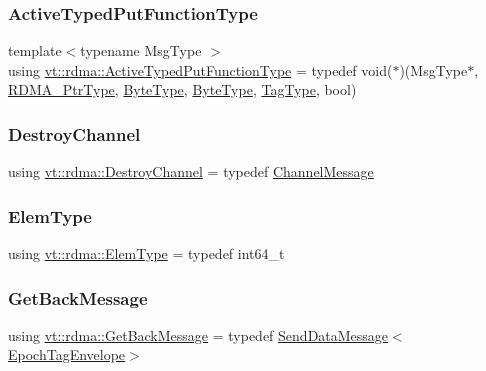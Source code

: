 \subsubsection{\texorpdfstring{Active\+Typed\+Put\+Function\+Type}{ActiveTypedPutFunctionType}}
{\footnotesize\ttfamily template$<$typename Msg\+Type $>$ \\
using \hyperlink{namespacevt_1_1rdma_a56f7eb7ecfa7e6824d3abb4afb634a37}{vt\+::rdma\+::\+Active\+Typed\+Put\+Function\+Type} = typedef void($\ast$)(Msg\+Type$\ast$, \hyperlink{namespacevt_aab05b4a584f7ee835a6d0f66915cf59b}{R\+D\+M\+A\+\_\+\+Ptr\+Type}, \hyperlink{namespacevt_aab8d55968084610ce3b17057981e9300}{Byte\+Type}, \hyperlink{namespacevt_aab8d55968084610ce3b17057981e9300}{Byte\+Type}, \hyperlink{namespacevt_a84ab281dae04a52a4b243d6bf62d0e52}{Tag\+Type}, bool)}

\mbox{\label{namespacevt_1_1rdma_a1273aeddd73c1ffac0d7383ef7a314d8}} 
\subsubsection{\texorpdfstring{Destroy\+Channel}{DestroyChannel}}
{\footnotesize\ttfamily using \hyperlink{namespacevt_1_1rdma_a1273aeddd73c1ffac0d7383ef7a314d8}{vt\+::rdma\+::\+Destroy\+Channel} = typedef \hyperlink{structvt_1_1rdma_1_1_channel_message}{Channel\+Message}}

\mbox{\label{namespacevt_1_1rdma_a38e310504e675aa1bcaf7811019b0df2}} 
\subsubsection{\texorpdfstring{Elem\+Type}{ElemType}}
{\footnotesize\ttfamily using \hyperlink{namespacevt_1_1rdma_a38e310504e675aa1bcaf7811019b0df2}{vt\+::rdma\+::\+Elem\+Type} = typedef int64\+\_\+t}

\mbox{\label{namespacevt_1_1rdma_a72a94b92eba75ec9fec43b2a9a4ad878}} 
\subsubsection{\texorpdfstring{Get\+Back\+Message}{GetBackMessage}}
{\footnotesize\ttfamily using \hyperlink{namespacevt_1_1rdma_a72a94b92eba75ec9fec43b2a9a4ad878}{vt\+::rdma\+::\+Get\+Back\+Message} = typedef \hyperlink{structvt_1_1rdma_1_1_send_data_message}{Send\+Data\+Message}$<$\hyperlink{namespacevt_af23b58014ced6898422213a0e5e6a27a}{Epoch\+Tag\+Envelope}$>$}

